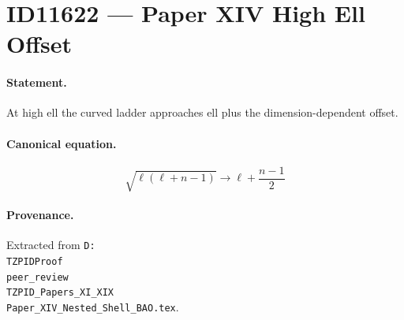 \section*{ID11622 --- Paper XIV High Ell Offset}

\paragraph{Statement.}
At high ell the curved ladder approaches ell plus the dimension-dependent offset.

\paragraph{Canonical equation.}
\[
\sqrt{\ell(\ell+n-1)}\to\ell+\frac{n-1}{2}
\]

\paragraph{Provenance.}
Extracted from \texttt{D:\\TZPIDProof\\peer\_review\\TZPID\_Papers\_XI\_XIX\\Paper\_XIV\_Nested\_Shell\_BAO.tex}.
